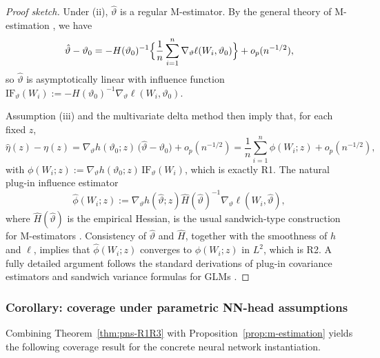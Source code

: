 \documentclass[accepted]{uai2026} %
\theoremstyle{plain}
\theoremstyle{definition}
\theoremstyle{remark}
\begin{document}
\begin{proof}[Proof sketch]
Under (ii), $\hat\vartheta$ is a regular M-estimator. By the general theory of
M-estimation \citep{newey1994largesample,vandervaart1998asymptotic}, we have
\[
  \hat\vartheta - \vartheta_0
  = -H(\vartheta_0)^{-1}
    \Bigl\{\frac{1}{n}\sum_{i=1}^n \nabla_\vartheta \ell(W_i,\vartheta_0)\Bigr\}
    + o_p(n^{-1/2}),
\]
so $\hat\vartheta$ is asymptotically linear with influence function
$\mathrm{IF}_\vartheta(W_i)
 := -H(\vartheta_0)^{-1}\nabla_\vartheta \ell(W_i,\vartheta_0)$.

Assumption (iii) and the multivariate delta method \citep{vandervaart1998asymptotic}
then imply that, for each fixed $z$,
\[
  \hat\eta(z) - \eta(z)
  = \nabla_\vartheta h(\vartheta_0;z)\,
    \bigl(\hat\vartheta - \vartheta_0\bigr)
    + o_p(n^{-1/2})
  = \frac{1}{n}\sum_{i=1}^n \phi(W_i;z) + o_p(n^{-1/2}),
\]
with
$\phi(W_i;z)
 := \nabla_\vartheta h(\vartheta_0;z)\,\mathrm{IF}_\vartheta(W_i)$,
which is exactly R1.
The natural plug-in influence estimator
\begin{equation}
\label{eq:plugin-influence}
  \hat\phi(W_i;z):= \nabla_\vartheta h(\hat\vartheta;z)
     \hat H(\hat\vartheta)^{-1}\nabla_\vartheta \ell(W_i,\hat\vartheta),
\end{equation}
where $\hat H(\hat\vartheta)$ is the empirical Hessian, is the usual
sandwich-type construction for M-estimators
\citep{white1982mlmisspecified,mccullagh1989glm,vandervaart1998asymptotic}.
Consistency of $\hat\vartheta$ and $\hat H$, together with the smoothness of
$h$ and $\ell$, implies that $\hat\phi(W_i;z)$ converges to $\phi(W_i;z)$ in
$L^2$, which is R2. A fully detailed argument follows the standard derivations
of plug-in covariance estimators and sandwich variance formulas for GLMs
\citep{mccullagh1989glm,vandervaart1998asymptotic}.
\end{proof}

\subsubsection{Corollary: coverage under parametric NN-head assumptions}
\label{subsubsec:corollary}

Combining Theorem~\ref{thm:pns-R1R3} with Proposition~\ref{prop:m-estimation}
yields the following coverage result for the concrete neural network
instantiation.
\end{document}
